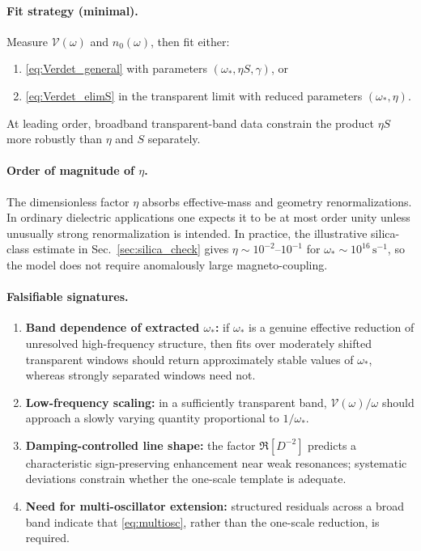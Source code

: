 \documentclass[11pt,a4paper]{article}
\begin{document}
    \paragraph{Fit strategy (minimal).}
    Measure $\mathcal{V}(\omega)$ and $n_0(\omega)$, then fit either:
    \begin{enumerate}
        \item \eqref{eq:Verdet_general} with parameters $(\omega_\ast,\eta S,\gamma)$, or
        \item \eqref{eq:Verdet_elimS} in the transparent limit with reduced parameters $(\omega_\ast,\eta)$.
    \end{enumerate}
    At leading order, broadband transparent-band data constrain the product $\eta S$ more robustly than $\eta$ and $S$ separately.
    
    \paragraph{Order of magnitude of $\eta$.}
    The dimensionless factor $\eta$ absorbs effective-mass and geometry renormalizations. In ordinary dielectric applications one expects it to be at most order unity unless unusually strong renormalization is intended. In practice, the illustrative silica-class estimate in Sec.~\ref{sec:silica_check} gives $\eta\sim 10^{-2}$--$10^{-1}$ for $\omega_\ast\sim 10^{16}\,\mathrm{s^{-1}}$, so the model does not require anomalously large magneto-coupling.
    
    \paragraph{Falsifiable signatures.}
    \begin{enumerate}
        \item \textbf{Band dependence of extracted $\omega_\ast$:} if $\omega_\ast$ is a genuine effective reduction of unresolved high-frequency structure, then fits over moderately shifted transparent windows should return approximately stable values of $\omega_\ast$, whereas strongly separated windows need not.
        \item \textbf{Low-frequency scaling:} in a sufficiently transparent band, $\mathcal{V}(\omega)/\omega$ should approach a slowly varying quantity proportional to $1/\omega_\ast$.
        \item \textbf{Damping-controlled line shape:} the factor $\Re[D^{-2}]$ predicts a characteristic sign-preserving enhancement near weak resonances; systematic deviations constrain whether the one-scale template is adequate.
        \item \textbf{Need for multi-oscillator extension:} structured residuals across a broad band indicate that \eqref{eq:multiosc}, rather than the one-scale reduction, is required.
    \end{enumerate}
    
\end{document}
